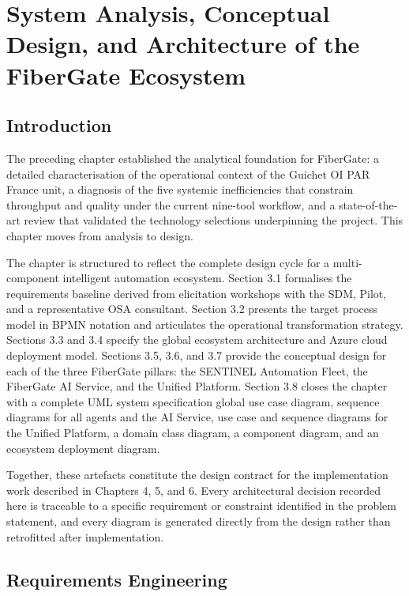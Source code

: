 \chapter{System Analysis, Conceptual Design, and Architecture of the FiberGate Ecosystem}

\section*{Introduction}

The preceding chapter established the analytical foundation for FiberGate: a detailed characterisation of the operational context of the Guichet OI PAR France unit, a diagnosis of the five systemic inefficiencies that constrain throughput and quality under the current nine-tool workflow, and a state-of-the-art review that validated the technology selections underpinning the project. This chapter moves from analysis to design.

The chapter is structured to reflect the complete design cycle for a multi-component intelligent automation ecosystem. Section 3.1 formalises the requirements baseline derived from elicitation workshops with the SDM, Pilot, and a representative OSA consultant. Section 3.2 presents the target process model in BPMN notation and articulates the operational transformation strategy. Sections 3.3 and 3.4 specify the global ecosystem architecture and Azure cloud deployment model. Sections 3.5, 3.6, and 3.7 provide the conceptual design for each of the three FiberGate pillars: the SENTINEL Automation Fleet, the FiberGate AI Service, and the Unified Platform. Section 3.8 closes the chapter with a complete UML system specification global use case diagram, sequence diagrams for all agents and the AI Service, use case and sequence diagrams for the Unified Platform, a domain class diagram, a component diagram, and an ecosystem deployment diagram.

Together, these artefacts constitute the design contract for the implementation work described in Chapters 4, 5, and 6. Every architectural decision recorded here is traceable to a specific requirement or constraint identified in the problem statement, and every diagram is generated directly from the design rather than retrofitted after implementation.

\section{Requirements Engineering}

